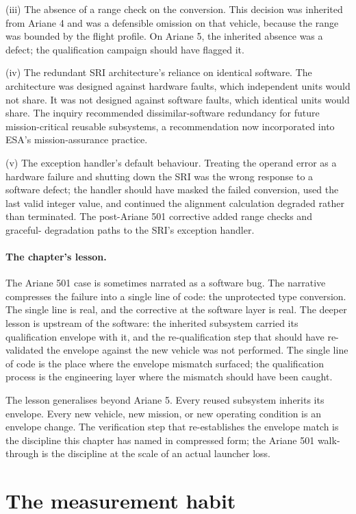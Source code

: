 (iii) The absence of a range check on the conversion. This decision
was inherited from Ariane 4 and was a defensible omission on that
vehicle, because the range was bounded by the flight profile. On
Ariane 5, the inherited absence was a defect; the qualification
campaign should have flagged it.

(iv) The redundant SRI architecture's reliance on identical
software. The architecture was designed against hardware faults,
which independent units would not share. It was not designed
against software faults, which identical units would share. The
inquiry recommended dissimilar-software redundancy for future
mission-critical reusable subsystems, a recommendation now
incorporated into ESA's mission-assurance practice.

(v) The exception handler's default behaviour. Treating the operand
error as a hardware failure and shutting down the SRI was the wrong
response to a software defect; the handler should have masked the
failed conversion, used the last valid integer value, and continued
the alignment calculation degraded rather than terminated. The
post-Ariane 501 corrective added range checks and graceful-
degradation paths to the SRI's exception handler.

\paragraph{The chapter's lesson.} The Ariane 501 case is sometimes
narrated as a software bug. The narrative compresses the failure
into a single line of code: the unprotected type conversion. The
single line is real, and the corrective at the software layer is
real. The deeper lesson is upstream of the software: the inherited
subsystem carried its qualification envelope with it, and the
re-qualification step that should have re-validated the envelope
against the new vehicle was not performed. The single line of
code is the place where the envelope mismatch surfaced; the
qualification process is the engineering layer where the mismatch
should have been caught.

The lesson generalises beyond Ariane 5. Every reused subsystem
inherits its envelope. Every new vehicle, new mission, or new
operating condition is an envelope change. The verification step
that re-establishes the envelope match is the discipline this
chapter has named in compressed form; the Ariane 501 walk-through
is the discipline at the scale of an actual launcher loss.

\section{The measurement habit}

